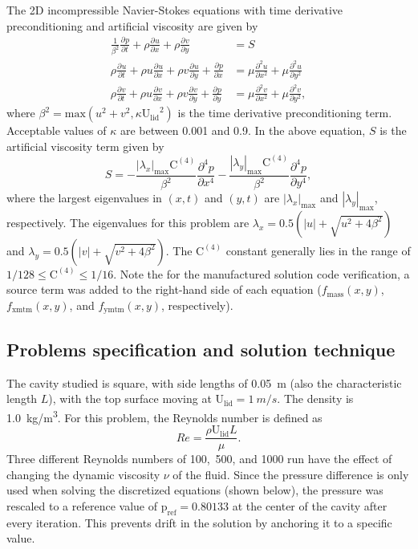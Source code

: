 \documentclass[10pt, letterpaper]{article}
\newcommand{\pf}[3][]{%
  \ensuremath{\frac{\partial^{#1} {#2}}{\partial {#3}^{#1}}}}
\begin{document}
The 2D incompressible Navier-Stokes equations with time derivative preconditioning
and artificial viscosity are given by
%
\begin{align} \label{eqn:2dns}
	\frac{1}{\beta^2} \pf{p}{t} + \rho \pf{u}{x} + \rho \pf{v}{y} &= S \\
	\rho \pf{u}{t} + \rho u \pf{u}{x} + \rho v \pf{u}{y} + \pf{p}{x} &= 
		\mu \pf[2]{u}{x} + \mu \pf[2]{u}{y} \\
	\rho \pf{v}{t} + \rho u \pf{v}{x} + \rho v \pf{v}{y} + \pf{p}{y} &= 
		\mu \pf[2]{v}{x} + \mu \pf[2]{v}{y},
\end{align}
%
where $\beta^2 = \mathrm{max}(u^2 + v^2, \kappa \mathrm{U_{lid}}^2)$ is the time 
derivative preconditioning term.  Acceptable values of $\kappa$ are between 0.001 
and 0.9.  In the above equation, $S$ is the artificial viscosity term given by
%
\begin{equation} \label{eqn:S}
	S = -\frac{|\lambda_x|_{\mathrm{max}} \mathrm{C}^{(4)}}{\beta^2} \pf[4]{p}{x}
	    -\frac{|\lambda_y|_{\mathrm{max}} \mathrm{C}^{(4)}}{\beta^2} \pf[4]{p}{y},
\end{equation}
%
where the largest eigenvalues in $(x,t)$ and $(y,t)$ are 
$|\lambda_x|_{\mathrm{max}}$ and
$|\lambda_y|_{\mathrm{max}}$, respectively.  The eigenvalues for this problem are 
$\lambda_x = 0.5(|u| + \sqrt{u^2 + 4\beta^2})$ and 
$\lambda_y = 0.5(|v| + \sqrt{v^2 + 4\beta^2})$.  The $\mathrm{C}^{(4)}$ constant
generally lies in the range of $1/128 \leq \mathrm{C}^{(4)} \leq 1/16$.  Note
the for the manufactured solution code verification, a source term was added to the
right-hand side of each equation ($f_\mathrm{mass}(x,y)$, $f_\mathrm{xmtm}(x,y)$,
and $f_\mathrm{ymtm}(x,y)$, respectively).


\subsection{Problems specification and solution technique}

The cavity studied is square, with side lengths of \SI{0.05}{m} (also the characteristic length $L$), with the top surface moving at 
$\mathrm{U_{lid}} = \SI{1}{m/s}$.  The
density is \SI{1.0}{kg/m^3}.  For this problem, the Reynolds number is
defined as
%
\begin{equation} \label{Re}
	Re = \frac{\rho \mathrm{U_{lid}} L}{\mu}.
\end{equation}
%
Three different Reynolds numbers of 100,~500, and 1000 run have the effect of
changing the dynamic viscosity $\nu$ of the fluid.  Since the
pressure difference is only used when solving the discretized equations (shown below),
the pressure was rescaled  to a reference value of $\mathrm{p_{ref}} = 0.80133$
at the center of the cavity after every iteration.  This prevents drift in the
solution by anchoring it to a specific value.
\end{document}
